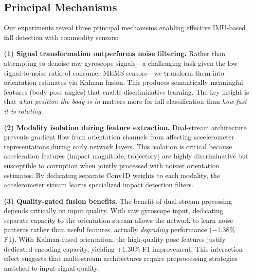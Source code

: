 
\subsection{Principal Mechanisms}
\label{subsec:findings}

Our experiments reveal three principal mechanisms enabling effective IMU-based fall detection with commodity sensors:

\textbf{(1) Signal transformation outperforms noise filtering.} Rather than attempting to denoise raw gyroscope signals---a challenging task given the low signal-to-noise ratio of consumer MEMS sensors---we transform them into orientation estimates via Kalman fusion. This produces semantically meaningful features (body pose angles) that enable discriminative learning. The key insight is that \textit{what position the body is in} matters more for fall classification than \textit{how fast it is rotating}.

\textbf{(2) Modality isolation during feature extraction.} Dual-stream architecture prevents gradient flow from orientation channels from affecting accelerometer representations during early network layers. This isolation is critical because acceleration features (impact magnitude, trajectory) are highly discriminative but susceptible to corruption when jointly processed with noisier orientation estimates. By dedicating separate Conv1D weights to each modality, the accelerometer stream learns specialized impact detection filters.

\textbf{(3) Quality-gated fusion benefits.} The benefit of dual-stream processing depends critically on input quality. With raw gyroscope input, dedicating separate capacity to the orientation stream allows the network to learn noise patterns rather than useful features, actually \textit{degrading} performance ($-$1.38\% F1). With Kalman-fused orientation, the high-quality pose features justify dedicated encoding capacity, yielding +1.30\% F1 improvement. This interaction effect suggests that multi-stream architectures require preprocessing strategies matched to input signal quality.

